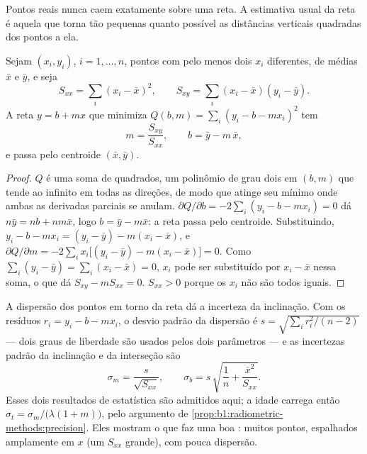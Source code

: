Pontos reais nunca caem exatamente sobre uma reta. A estimativa usual da reta é aquela que torna
tão pequenas quanto possível as distâncias verticais quadradas dos pontos a ela.

\begin{proposition}\label{prop:b1:radiometric-methods:lsq}
Sejam $(x_i, y_i)$, $i = 1, \dots, n$, pontos com pelo menos dois $x_i$ diferentes, de médias
$\bar x$ e $\bar y$, e seja
\[
  S_{xx} = \sum_i (x_i - \bar x)^2, \qquad S_{xy} = \sum_i (x_i - \bar x)(y_i - \bar y).
\]
A reta $y = b + m x$ que minimiza $Q(b, m) = \sum_i (y_i - b - m x_i)^2$ tem
\[
  m = \frac{S_{xy}}{S_{xx}}, \qquad b = \bar y - m\,\bar x ,
\]
e passa pelo centroide $(\bar x, \bar y)$.
\end{proposition}

\begin{proof}
$Q$ é uma soma de quadrados, um polinômio de grau dois em $(b, m)$ que tende ao infinito em
todas as direções, de modo que atinge seu mínimo onde ambas as derivadas parciais se anulam.
$\partial Q/\partial b = -2 \sum_i (y_i - b - m x_i) = 0$ dá $n\bar y = n b + n m \bar x$, logo
$b = \bar y - m \bar x$: a reta passa pelo centroide. Substituindo, $y_i - b - m x_i = (y_i - \bar y) - m(x_i -
\bar x)$, e $\partial Q/\partial m = -2 \sum_i x_i \bigl[(y_i - \bar y) - m(x_i
- \bar x)\bigr] = 0$. Como $\sum_i (y_i - \bar y) = \sum_i (x_i - \bar x) = 0$, $x_i$
pode ser substituído por $x_i - \bar x$ nessa soma, o que dá $S_{xy} - m S_{xx} = 0$.
$S_{xx} > 0$ porque os $x_i$ não são todos iguais.
\end{proof}

A dispersão dos pontos em torno da reta dá a incerteza da inclinação. Com os resíduos
$r_i = y_i - b - m x_i$, o desvio padrão da dispersão é $s = \sqrt{\sum_i r_i^2/(n-2)}$ ---
dois graus de liberdade são usados pelos dois parâmetros --- e as incertezas padrão da
inclinação e da interseção são
\[
  \sigma_m = \frac{s}{\sqrt{S_{xx}}}, \qquad
  \sigma_b = s\,\sqrt{\frac1n + \frac{\bar x^2}{S_{xx}}} .
\]
Esses dois resultados de estatística são admitidos aqui; a idade carrega então
$\sigma_t = \sigma_m/\bigl(\lambda(1 + m)\bigr)$, pelo argumento de
\cref{prop:b1:radiometric-methods:precision}. Eles mostram o que faz uma boa : muitos
pontos, espalhados amplamente em $x$ (um $S_{xx}$ grande), com pouca dispersão.

